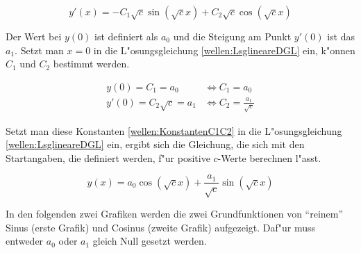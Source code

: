 \begin{equation}
	y'(x)=-C_1 \sqrt{c} \sin(\sqrt{c}x) + C_2 \sqrt{c} \cos(\sqrt{c}x)
\end{equation}

Der Wert bei $y(0)$ ist definiert als $a_0$ und die Steigung am Punkt $y'(0)$ 
ist das $a_1$. Setzt man $x=0$ in die L"osungsgleichung 
\ref{wellen:LsglineareDGL} ein, k"onnen $C_1$ und $C_2$ bestimmt werden.

\begin{equation}
	\begin{split}
		y(0) = C_1 = a_0 &\Leftrightarrow C_1 = a_0 \\
		y'(0) = C_2 \sqrt{c} = a_1 &\Leftrightarrow C_2 = \frac{a_1}{\sqrt{c}}
	\end{split}
	\label{wellen:KonstantenC1C2}
\end{equation}

Setzt man diese Konstanten \ref{wellen:KonstantenC1C2} in die L"osungsgleichung 
\ref{wellen:LsglineareDGL} 
ein, ergibt sich die Gleichung, die sich mit den Startangaben, die definiert 
werden, f"ur positive $c$-Werte berechnen l"asst.

\begin{equation}
	y(x) = a_0 \cos(\sqrt{c}x) + \frac{a_1}{\sqrt{c}} \sin(\sqrt{c}x)
	\label{wellen:LSGleichung}
\end{equation}

In den folgenden zwei Grafiken werden die zwei Grundfunktionen von ``reinem''
Sinus (erste Grafik) und Cosinus (zweite Grafik) aufgezeigt. Daf"ur muss 
entweder $a_0$ oder $a_1$ gleich Null gesetzt werden.

